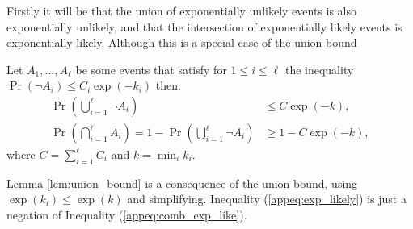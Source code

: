             Firstly it will be that the union of exponentially unlikely events is also exponentially unlikely, and that the intersection of exponentially likely events is exponentially likely. Although this is a special case of the union bound  
            \begin{lemma} \label{lem:union_bound}
                Let $A_1,...,A_{\ell}$ be some events that satisfy for $1\leq i \leq \ell$ the inequality $\Pr(\lnot A_i) \leq C_i\exp(-k_i)$ then:
                \begin{align}
                    \Pr\left(\bigcup_{i=1}^\ell \lnot A_i\right) &\leq C\exp(-k), \label{appeq:comb_exp_like} \\
                    \Pr\left(\bigcap_{i=1}^\ell A_i\right) = 1-\Pr\left(\bigcup_{i=1}^\ell \lnot A_i\right) &\geq 1-C\exp(-k), \label{appeq:exp_likely}
                \end{align}
                where $C=\sum_{i=1}^\ell C_i$ and $k = \min_i k_i$.
            \end{lemma}
            \begin{proofoutline}
                Lemma \ref{lem:union_bound} is a consequence of the union bound, using $\exp(k_i)\leq\exp(k)$ and simplifying. Inequality (\ref{appeq:exp_likely}) is just a negation of Inequality (\ref{appeq:comb_exp_like}).
            \end{proofoutline}






